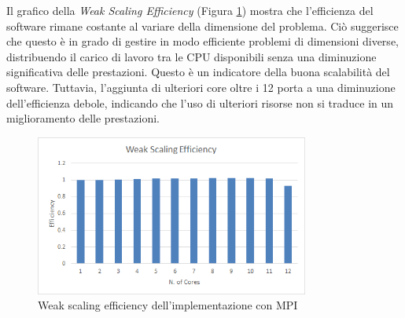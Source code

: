 \documentclass[a4paper, 12pt]{report}
\begin{document}
\begin{sloppypar}
  \newpage
  \noindent
  Il grafico della \textit{Weak Scaling Efficiency} (Figura \ref{fig:mpi_wse}) mostra che l'efficienza del software rimane costante 
  al variare della dimensione del problema. Ciò suggerisce che questo è in grado di gestire in modo 
  efficiente problemi di dimensioni diverse, distribuendo il carico di lavoro tra le CPU disponibili senza 
  una diminuzione significativa delle prestazioni. Questo è un indicatore della buona scalabilità del software. 
  Tuttavia, l'aggiunta di ulteriori core oltre i 12 porta a una diminuzione dell'efficienza debole, 
  indicando che l'uso di ulteriori risorse non si traduce in un miglioramento delle prestazioni.

  \begin{figure}[ht]
    \centering
    \includegraphics[width=9cm]{img/mpi-wse.png}
    \caption{Weak scaling efficiency dell'implementazione con MPI}
    \label{fig:mpi_wse}
  \end{figure}

\end{sloppypar}
\end{document}
